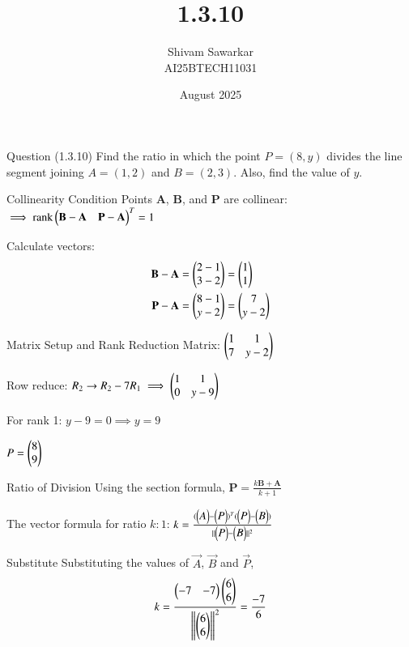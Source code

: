 \documentclass{beamer}
\title %
{1.3.10}
\date{August  2025}
\author %
{Shivam Sawarkar \\ AI25BTECH11031}
\begin{document}
\frame{\titlepage}
\begin{frame}{Question (1.3.10)}
Find the ratio in which the point $P = (8, y)$ divides the line segment joining
$A = (1, 2)$ and $B = (2, 3)$. Also, find the value of $y$.
\end{frame}


\begin{frame}{Collinearity Condition}
Points \textbf{A}, \textbf{B}, and \textbf{P} are collinear:
$
\implies \text{rank} \begin{pmatrix}\mathbf{B} - \mathbf{A} & \mathbf{P} - \mathbf{A}\end{pmatrix}^T  = 1
$

Calculate vectors:
\begin{align*}
\textbf{B} - \textbf{A} &= \begin{pmatrix}2 - 1 \\ 3 - 2\end{pmatrix} = \begin{pmatrix}1 \\ 1\end{pmatrix} \\
\textbf{P} - \textbf{A} &= \begin{pmatrix}8 - 1 \\ y - 2\end{pmatrix} = \begin{pmatrix}7 \\ y - 2\end{pmatrix}
\end{align*}
\end{frame}

\begin{frame}{Matrix Setup and Rank Reduction}
Matrix:
$
\begin{pmatrix}
1 & 1 \\
7 & y - 2\end{pmatrix}
$

Row reduce:
$
R_2 \rightarrow R_2 - 7R_1 \implies
\begin{pmatrix}
1 & 1 \\
0 & y - 9\end{pmatrix}
$

For rank 1:
$
y - 9 = 0 \implies y = 9
$

$
P = \begin{pmatrix}8 \\ 9\end{pmatrix}
$
\end{frame}

\begin{frame}{Ratio of Division}
Using the section formula,
$
\textbf{P} = \frac{k \textbf{B} + \textbf{A}}{k+1}
$

The vector formula for ratio \(k:1\):
$
k = \frac{(\begin{pmatrix}A\end{pmatrix} - \begin{pmatrix}P\end{pmatrix})^T (\begin{pmatrix}P\end{pmatrix} - \begin{pmatrix}B\end{pmatrix})}{\|\begin{pmatrix}P\end{pmatrix} - \begin{pmatrix}B\end{pmatrix}\|^2}
$
\end{frame}

\begin{frame}{Substitute}
Substituting the values of $\vec{A}$, $\vec{B}$ and $\vec{P}$,
\begin{align}
k=\frac{\begin{pmatrix}-7 & -7\end{pmatrix}\begin{pmatrix}6 \\ 6\end{pmatrix}}{\left\lVert\begin{pmatrix}6 \\ 6\end{pmatrix}\right\rVert^2}=\frac{-7}{6}
\end{align}
\end{frame}
\end{document}
